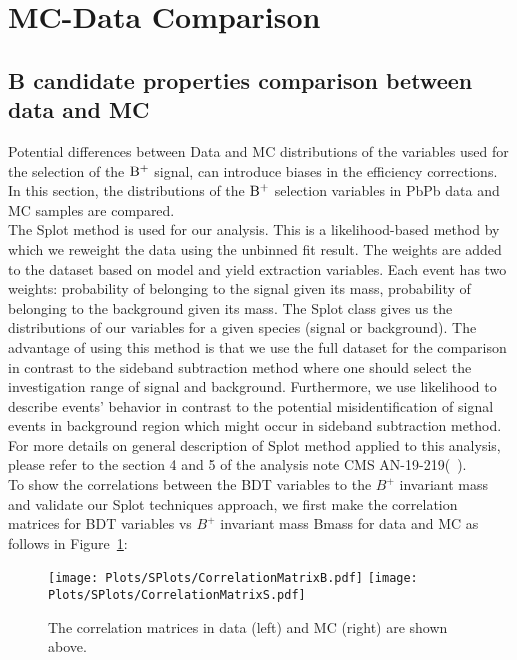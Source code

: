 \section{MC-Data Comparison}
\label{sec:mcdatacomparison}
\subsection{B candidate properties comparison between data and MC}
Potential differences between Data and MC distributions of the variables used for the selection of the $\mathrm{B}^{+}$ signal, can introduce biases in the efficiency corrections. In this section, the distributions of the $\mathrm{B}^{+}$ selection variables in PbPb data and MC samples are compared. \\

The Splot method is used for our analysis. This is a likelihood-based method by which we reweight the data using the unbinned fit result. The weights are added to the dataset based on model and yield extraction variables. Each event has two weights: probability of belonging to the signal given its mass, probability of belonging to the background given its mass. The Splot class gives us the distributions of our variables for a given species (signal or background). The advantage of using this method is that we use the full dataset for the comparison in contrast to the sideband subtraction method where one should select the investigation range of signal and background. Furthermore, we use likelihood to describe events' behavior in contrast to the potential misidentification of signal events in background region which might occur in sideband subtraction method. For more details on general description of Splot method applied to this analysis, please refer to the section 4 and 5 of the analysis note CMS AN-19-219(~\cite{AN-19-219}). \\

To show the correlations between the BDT variables to the $B^+$ invariant mass and validate our Splot techniques approach, we first make the correlation matrices for BDT variables vs $B^+$ invariant mass Bmass for data and MC as follows in Figure~\ref{fig:CorrMatrice_BDT}:

\begin{figure}[h]
\begin{center}
\texttt{[image: Plots/SPlots/CorrelationMatrixB.pdf]}
\texttt{[image: Plots/SPlots/CorrelationMatrixS.pdf]}
\caption{The correlation matrices in data (left) and MC (right) are shown above.}
\label{fig:CorrMatrice_BDT}
\end{center}
\end{figure}

